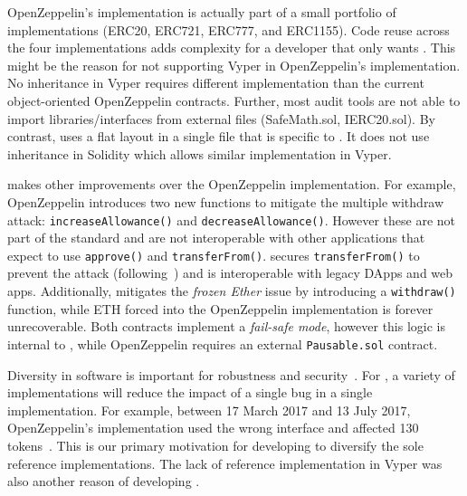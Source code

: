 OpenZeppelin's implementation is actually part of a small portfolio of implementations (ERC20, ERC721, ERC777, and ERC1155). Code reuse across the four implementations adds complexity for a developer that only wants \erc. This might be the reason for not supporting Vyper in OpenZeppelin's implementation. No inheritance in Vyper requires different implementation than the current object-oriented OpenZeppelin contracts. Further, most audit tools are not able to import libraries/interfaces from external files (\eg SafeMath.sol, IERC20.sol). By contrast, \sys uses a flat layout in a single file that is specific to \erc. It does not use inheritance in Solidity which allows similar implementation in Vyper.  


\sys makes other improvements over the OpenZeppelin implementation. For example, OpenZeppelin introduces two new functions to mitigate the multiple withdraw attack: \texttt{increaseAllowance()} and \texttt{decreaseAllowance()}. However these are not part of the \erc standard and are not  interoperable with other applications that expect to use \texttt{approve()} and \texttt{transferFrom()}. \sys secures \texttt{transferFrom()} to prevent the attack (following~\cite{ERC20MWA}) and is interoperable with legacy DApps and web apps. Additionally, \sys mitigates the \textit{frozen Ether} issue by introducing a \texttt{withdraw()} function, while ETH forced into the OpenZeppelin implementation is forever unrecoverable. Both contracts implement a \textit{fail-safe mode}, however this logic is internal to \sys, while OpenZeppelin requires an external \texttt{Pausable.sol} contract.

Diversity in software is important for robustness and security~\cite{FSA97,FHS97}. For \erc, a variety of implementations will reduce the impact of a single bug in a single implementation. For example, between 17 March 2017 and 13 July 2017, OpenZeppelin's implementation used the wrong interface and affected 130 tokens~\cite{ErcBug}. This is our primary motivation for developing \sys to diversify the sole reference implementations. The lack of reference implementation in Vyper was also another reason of developing \sys.

